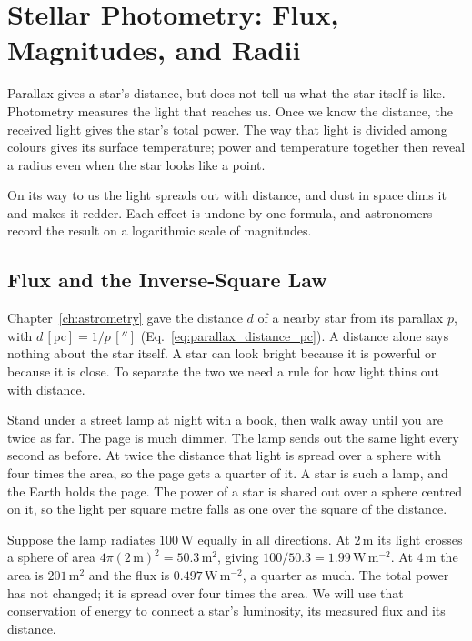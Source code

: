 \chapter{Stellar Photometry: Flux, Magnitudes, and Radii}
\label{ch:photometry}


Parallax gives a star's distance, but does not tell us what the star itself is like. Photometry measures the light that reaches us. Once we know the distance, the received light gives the star's total power. The way that light is divided among colours gives its surface temperature; power and temperature together then reveal a radius even when the star looks like a point.

On its way to us the light spreads out with distance, and dust in space dims it and makes it redder. Each effect is undone by one formula, and astronomers record the result on a logarithmic scale of magnitudes.

\section{Flux and the Inverse-Square Law}
\label{ph:sec:flux}

Chapter~\ref{ch:astrometry} gave the distance $d$ of a nearby star from its parallax $p$, with $d\,[\mathrm{pc}]=1/p\,['']$ (Eq.~\eqref{eq:parallax_distance_pc}). A distance alone says nothing about the star itself. A star can look bright because it is powerful or because it is close. To separate the two we need a rule for how light thins out with distance.

Stand under a street lamp at night with a book, then walk away until you are twice as far. The page is much dimmer. The lamp sends out the same light every second as before. At twice the distance that light is spread over a sphere with four times the area, so the page gets a quarter of it. A star is such a lamp, and the Earth holds the page. The power of a star is shared out over a sphere centred on it, so the light per square metre falls as one over the square of the distance.

Suppose the lamp radiates $100\,\mathrm W$ equally in all directions. At $2\,\mathrm m$ its light crosses a sphere of area $4\pi(2\,\mathrm m)^2=50.3\,\mathrm m^2$, giving $100/50.3=1.99\,\mathrm{W\,m^{-2}}$. At $4\,\mathrm m$ the area is $201\,\mathrm m^2$ and the flux is $0.497\,\mathrm{W\,m^{-2}}$, a quarter as much. The total power has not changed; it is spread over four times the area. We will use that conservation of energy to connect a star's luminosity, its measured flux and its distance.

